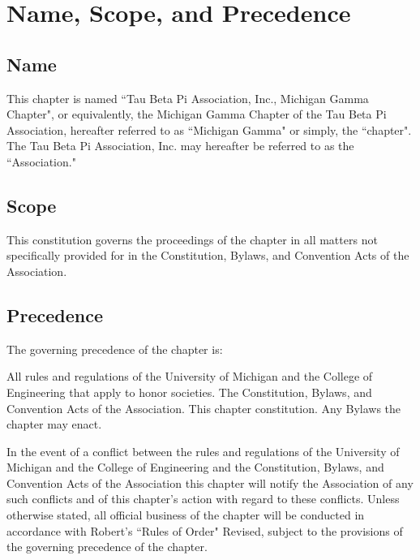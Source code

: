\chapter{Name, Scope, and Precedence}

\section{Name}
This chapter is named ``Tau Beta Pi Association, Inc., Michigan Gamma Chapter", or equivalently, the Michigan Gamma Chapter of the Tau Beta Pi Association, hereafter referred to as ``Michigan Gamma" or simply, the ``chapter". The Tau Beta Pi Association, Inc. may hereafter be referred to as the ``Association."

\section{Scope}
This constitution governs the proceedings of the chapter in all matters not specifically provided for in the Constitution, Bylaws, and Convention Acts of the Association.
\section{Precedence} The governing precedence of the chapter is:

\begin{tight_enumerate}

\itemnotoc  All rules and regulations of the University of Michigan and the College of Engineering that apply to honor societies.
\itemnotoc  The Constitution, Bylaws, and Convention Acts of the Association.
\itemnotoc This chapter constitution.
\itemnotoc Any Bylaws the chapter may enact.

\end{tight_enumerate}

In the event of a conflict between  the rules and regulations of the University of Michigan and the College of Engineering and the Constitution, Bylaws, and Convention Acts of the Association this chapter will notify the Association of any such conflicts and of this chapter's action with regard to these conflicts. Unless otherwise stated, all official business of the chapter will  be conducted in accordance with Robert's ``Rules of Order" Revised, subject to the provisions of the governing precedence of the chapter.

